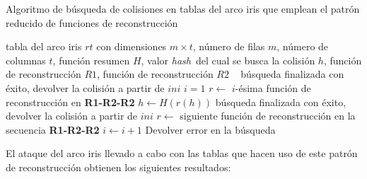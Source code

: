 \documentclass[12pt,spanish,listoffigures,listoftables,listofalgorithms]{tfgetsinf}
\newcommand{\hash}{\textit{hash}}
\begin{document}
\begin{algorithm}[H]
	\caption{Algoritmo de búsqueda de colisiones en tablas del arco iris que emplean el patrón reducido de funciones de reconstrucción}
	\label{buscolspp}
	\begin{algorithmic}
		\REQUIRE tabla del arco iris $rt$ con dimensiones $m \times t$, número de filas $m$, número de columnas $t$, función resumen $H$, valor \hash~del cual se busca la colisión $h$, función de reconstrucción $R1$, función de reconstrucción $R2$
		\STATE ~
			\STATE búsqueda finalizada con éxito, devolver la colisión a partir de $ini$
		\ENDIF
		\STATE $i = 1$
			\STATE $r \leftarrow $ $i$-ésima función de reconstrucción en \textbf{R1-R2-R2}
				\STATE $h \leftarrow H(r(h))$
					\STATE búsqueda finalizada con éxito, devolver la colisión a partir de $ini$
				\ELSE
					\STATE $r \leftarrow $ siguiente función de reconstrucción en la secuencia \textbf{R1-R2-R2}
				\ENDIF
			\ENDFOR
			\STATE $i \leftarrow i + 1$
		\ENDWHILE
		\STATE Devolver error en la búsqueda
	\end{algorithmic}
\end{algorithm}

El ataque del arco iris llevado a cabo con las tablas que hacen uso de este patrón de reconstrucción obtienen los siguientes resultados:
\end{document}
